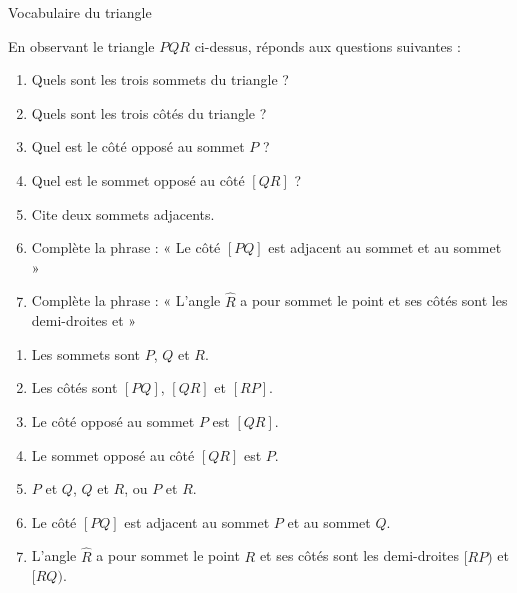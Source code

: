 \documentclass[../../syllabus_1.tex]{subfiles}
\begin{document}
\newpage
\begin{exercise}
    Vocabulaire du triangle

    \begin{center}
    \end{center}

    En observant le triangle $PQR$ ci-dessus, réponds aux questions suivantes :
    \begin{enumerate}
        \item Quels sont les trois sommets du triangle ?
        \item Quels sont les trois côtés du triangle ?
        \item Quel est le côté opposé au sommet $P$ ?
        \item Quel est le sommet opposé au côté $[QR]$ ?
        \item Cite deux sommets adjacents.
        \item Complète la phrase : « Le côté $[PQ]$ est adjacent au sommet \blank[width=1cm]{} et au sommet \blank[width=1cm]{} »
        \item Complète la phrase : « L'angle $\widehat{R}$ a pour sommet le point \blank[width=1cm]{} et ses côtés sont les demi-droites \blank[width=1cm]{} et \blank[width=1cm]{} »
    \end{enumerate}
\end{exercise}

\begin{solution}
    \begin{enumerate}
        \item Les sommets sont $P$, $Q$ et $R$.
        \item Les côtés sont $[PQ]$, $[QR]$ et $[RP]$.
        \item Le côté opposé au sommet $P$ est $[QR]$.
        \item Le sommet opposé au côté $[QR]$ est $P$.
        \item $P$ et $Q$, $Q$ et $R$, ou $P$ et $R$.
        \item Le côté $[PQ]$ est adjacent au sommet $P$ et au sommet $Q$.
        \item L'angle $\widehat{R}$ a pour sommet le point $R$ et ses côtés sont les demi-droites $[RP)$ et $[RQ)$.
    \end{enumerate}
\end{solution}
\end{document}

